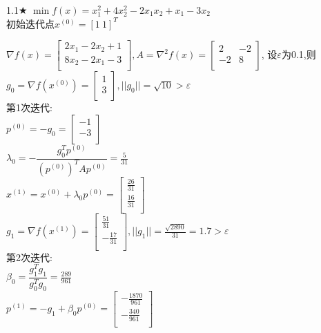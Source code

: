 \begin{problem}{1.1$\bigstar$}
    $\min f(x)=x_1^2+4x_2^2-2x_1x_2+x_1-3x_2$\\
    初始迭代点${x^{(0)}}=[1\ 1]^T$
\end{problem}
\begin{solution}
    $\nabla f(x)=\begin{bmatrix}
        2x_1-2x_2+1  \\
        8x_2-2x_1-3  \\
    \end{bmatrix}, A=\nabla^2 f(x)=\begin{bmatrix}
        2   & -2  \\
        -2  & 8  \\
    \end{bmatrix}$,
    设$\varepsilon$为0.1,则\\
    $g_0=\nabla f(x^{(0)})=\begin{bmatrix} 1\\3\\\end{bmatrix},||g_0||=\sqrt{10}>\varepsilon$\\
    第1次迭代:\\
    $p^{(0)}=-g_0=\begin{bmatrix} -1\\-3\\\end{bmatrix}$\\
    $\lambda_0=-\dfrac{g_0^Tp^{(0)}}{(p^{(0)})^TAp^{(0)}}=\frac{5}{31}$\\
    $x^{(1)}=x^{(0)}+\lambda_0p^{(0)}=\begin{bmatrix} \frac{26}{31}\\\frac{16}{31}\\\end{bmatrix}$\\
    $g_1=\nabla f(x^{(1)})=\begin{bmatrix} \frac{51}{31}\\-\frac{17}{31}\\\end{bmatrix},||g_1||=\frac{\sqrt{2890}}{31}=1.7>\varepsilon$\\
    第2次迭代:\\
    $\beta_0=\dfrac{g_1^Tg_1}{g_0^Tg_0}=\frac{289}{961}$\\
    $p^{(1)}=-g_1+\beta_0p^{(0)}=\begin{bmatrix} -\frac{1870}{961}\\-\frac{340}{961}\\\end{bmatrix}$\\

\end{solution}
